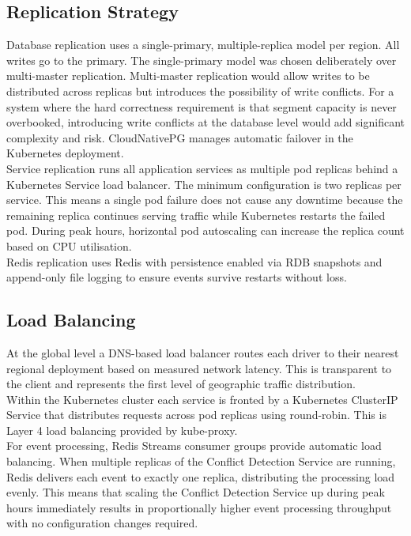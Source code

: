 \documentclass{article}
\begin{document}
\subsection{Replication Strategy}
Database replication uses a single-primary, multiple-replica model per region. All writes go to the primary. The single-primary model was chosen deliberately over multi-master replication. Multi-master replication would allow writes to be distributed across replicas but introduces the possibility of write conflicts. For a system where the hard correctness requirement is that segment capacity is never overbooked, introducing write conflicts at the database level would add significant complexity and risk. CloudNativePG manages automatic failover in the Kubernetes deployment. \\
Service replication runs all application services as multiple pod replicas behind a Kubernetes Service load balancer. The minimum configuration is two replicas per service. This means a single pod failure does not cause any downtime because the remaining replica continues serving traffic while Kubernetes restarts the failed pod. During peak hours, horizontal pod autoscaling can increase the replica count based on CPU utilisation.\\
Redis replication uses Redis with persistence enabled via RDB snapshots and append-only file logging to ensure events survive restarts without loss.

\subsection{Load Balancing}
At the global level a DNS-based load balancer routes each driver to their nearest regional deployment based on measured network latency. This is transparent to the client and represents the first level of geographic traffic distribution.\\
Within the Kubernetes cluster each service is fronted by a Kubernetes ClusterIP Service that distributes requests across pod replicas using round-robin. This is Layer 4 load balancing provided by kube-proxy.\\
For event processing, Redis Streams consumer groups provide automatic load balancing. When multiple replicas of the Conflict Detection Service are running, Redis delivers each event to exactly one replica, distributing the processing load evenly. This means that scaling the Conflict Detection Service up during peak hours immediately results in proportionally higher event processing throughput with no configuration changes required.
\end{document}
